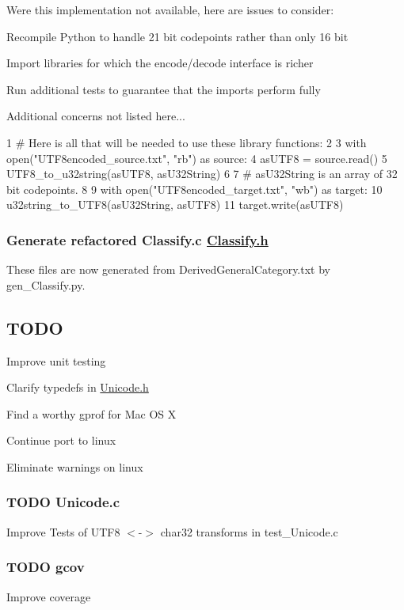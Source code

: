 Were this implementation not available, here are issues to consider\+:
\begin{DoxyItemize}
\item Recompile Python to handle 21 bit codepoints rather than only 16 bit
\item Import libraries for which the encode/decode interface is richer
\item Run additional tests to guarantee that the imports perform fully
\item Additional concerns not listed here...
\end{DoxyItemize}


\begin{DoxyCode}
1 # Here is all that will be needed to use these library functions:
2 
3 with open("UTF8encoded\_source.txt", "rb") as source:
4     asUTF8 = source.read()
5     UTF8\_to\_u32string(asUTF8, asU32String)
6 
7 # asU32String is an array of 32 bit codepoints.
8 
9 with open("UTF8encoded\_target.txt", "wb") as target:
10     u32string\_to\_UTF8(asU32String, asUTF8)
11     target.write(asUTF8)
\end{DoxyCode}


\subsubsection*{Generate refactored Classify.\+c \hyperlink{_classify_8h_source}{Classify.\+h}}

These files are now generated from Derived\+General\+Category.\+txt by gen\+\_\+\+Classify.\+py.

\subsection*{T\+O\+D\+O}


\begin{DoxyItemize}
\item Improve unit testing
\item Clarify typedefs in \hyperlink{_unicode_8h_source}{Unicode.\+h}
\item Find a worthy gprof for Mac O\+S X
\item Continue port to linux
\item Eliminate warnings on linux
\end{DoxyItemize}

\subsubsection*{T\+O\+D\+O Unicode.\+c}


\begin{DoxyItemize}
\item Improve Tests of U\+T\+F8 $<$-\/$>$ char32 transforms in test\+\_\+\+Unicode.\+c
\end{DoxyItemize}

\subsubsection*{T\+O\+D\+O gcov}


\begin{DoxyItemize}
\item Improve coverage 
\end{DoxyItemize}